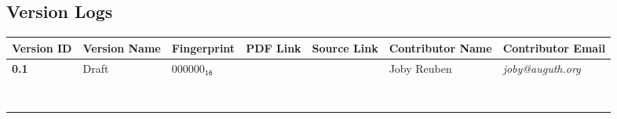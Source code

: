 \documentclass[../alan-handbook.tex]{subfiles}
\begin{document}
\onecolumn

\subsection{Version Logs}

\begin{longtable}[c]{|l|l|l|l|l|l|l|}
    \hline
    \textbf{Version ID} & \textbf{Version Name} & \textbf{Fingerprint}              & \textbf{PDF Link} & \textbf{Source Link} & \textbf{Contributor Name} & \textbf{Contributor Email} \\ \hline
    \endfirsthead
    \endhead
    \textbf{0.1}        & Draft                 & $\text{000000}_{\texttt{16}}$ &                   &                      & Joby Reuben               & \textit{joby@auguth.org}   \\ \hline
                        &                       &                               &                   &                      &                           &                            \\ \hline
                        &                       &                               &                   &                      &                           &                            \\ \hline
                        &                       &                               &                   &                      &                           &                            \\ \hline
                        &                       &                               &                   &                      &                           &                            \\ \hline
                        &                       &                               &                   &                      &                           &                            \\ \hline
                        &                       &                               &                   &                      &                           &                            \\ \hline
                        &                       &                               &                   &                      &                           &                            \\ \hline
                        &                       &                               &                   &                      &                           &                            \\ \hline

\end{longtable}
\end{document}
